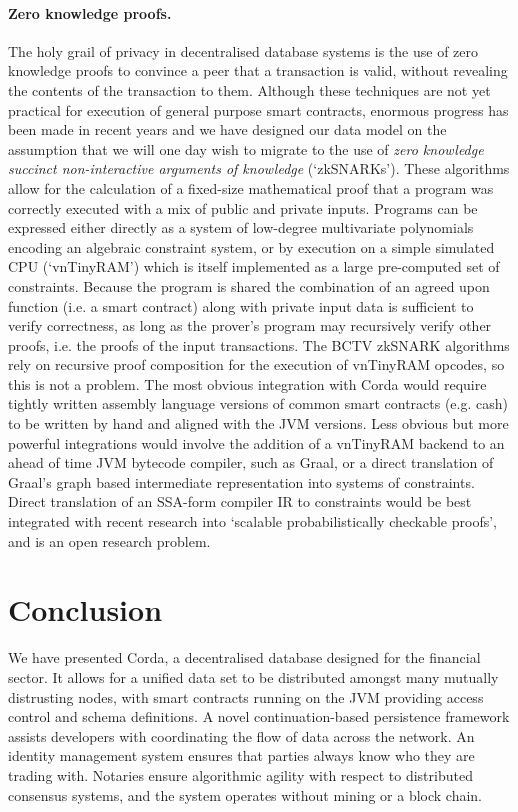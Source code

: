 \documentclass{article}
\begin{document}
\paragraph{Zero knowledge proofs.}The holy grail of privacy in decentralised database systems is the use of zero
knowledge proofs to convince a peer that a transaction is valid, without revealing the contents of the transaction
to them. Although these techniques are not yet practical for execution of general purpose smart contracts, enormous
progress has been made in recent years and we have designed our data model on the assumption that we will one day
wish to migrate to the use of \emph{zero knowledge succinct non-interactive arguments of knowledge}\cite{184425}
(`zkSNARKs'). These algorithms allow for the calculation of a fixed-size mathematical proof that a program was
correctly executed with a mix of public and private inputs. Programs can be expressed either directly as a system
of low-degree multivariate polynomials encoding an algebraic constraint system, or by execution on a simple
simulated CPU (`vnTinyRAM') which is itself implemented as a large pre-computed set of constraints. Because the
program is shared the combination of an agreed upon function (i.e. a smart contract) along with private input data
is sufficient to verify correctness, as long as the prover's program may recursively verify other proofs, i.e. the
proofs of the input transactions. The BCTV zkSNARK algorithms rely on recursive proof composition for the execution
of vnTinyRAM opcodes, so this is not a problem. The most obvious integration with Corda would require tightly
written assembly language versions of common smart contracts (e.g. cash) to be written by hand and aligned with the
JVM versions. Less obvious but more powerful integrations would involve the addition of a vnTinyRAM backend to an
ahead of time JVM bytecode compiler, such as Graal\cite{Graal}, or a direct translation of Graal's graph based
intermediate representation into systems of constraints. Direct translation of an SSA-form compiler IR to
constraints would be best integrated with recent research into `scalable probabilistically checkable
proofs'\cite{cryptoeprint:2016:646}, and is an open research problem.


\section{Conclusion}

We have presented Corda, a decentralised database designed for the financial sector. It allows for a unified data
set to be distributed amongst many mutually distrusting nodes, with smart contracts running on the JVM providing
access control and schema definitions. A novel continuation-based persistence framework assists developers with
coordinating the flow of data across the network. An identity management system ensures that parties always know
who they are trading with. Notaries ensure algorithmic agility with respect to distributed consensus systems, and
the system operates without mining or a block chain.
\end{document}
